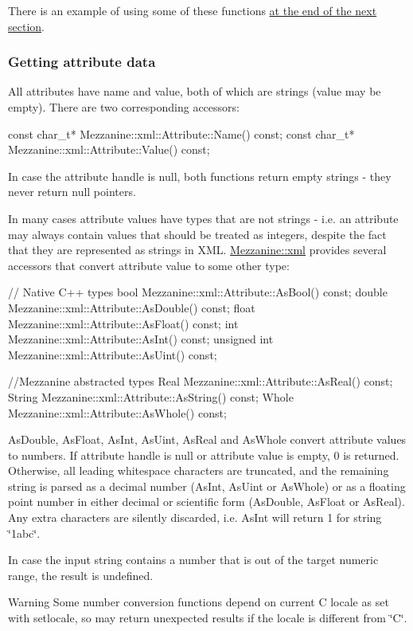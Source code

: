  \par
 There is an example of using some of these functions \hyperlink{XMLManual_XMLAccessingAttributeData}{at the end of the next section}. \hypertarget{XMLManual_XMLAccessingAttributeData}{}\subsubsection{Getting attribute data}\label{XMLManual_XMLAccessingAttributeData}
All attributes have name and value, both of which are strings (value may be empty). There are two corresponding accessors: 
\begin{DoxyCode}
 const char_t* Mezzanine::xml::Attribute::Name() const;
 const char_t* Mezzanine::xml::Attribute::Value() const;
\end{DoxyCode}
 In case the attribute handle is null, both functions return empty strings -\/ they never return null pointers. \par
 \par
 In many cases attribute values have types that are not strings -\/ i.e. an attribute may always contain values that should be treated as integers, despite the fact that they are represented as strings in XML. \hyperlink{namespaceMezzanine_1_1xml}{Mezzanine::xml} provides several accessors that convert attribute value to some other type: 
\begin{DoxyCode}
 // Native C++ types
 bool Mezzanine::xml::Attribute::AsBool() const;
 double Mezzanine::xml::Attribute::AsDouble() const;
 float Mezzanine::xml::Attribute::AsFloat() const;
 int Mezzanine::xml::Attribute::AsInt() const;
 unsigned int Mezzanine::xml::Attribute::AsUint() const;

 //Mezzanine abstracted types
 Real Mezzanine::xml::Attribute::AsReal() const;
 String Mezzanine::xml::Attribute::AsString() const;
 Whole Mezzanine::xml::Attribute::AsWhole() const;
\end{DoxyCode}
 AsDouble, AsFloat, AsInt, AsUint, AsReal and AsWhole convert attribute values to numbers. If attribute handle is null or attribute value is empty, 0 is returned. Otherwise, all leading whitespace characters are truncated, and the remaining string is parsed as a decimal number (AsInt, AsUint or AsWhole) or as a floating point number in either decimal or scientific form (AsDouble, AsFloat or AsReal). Any extra characters are silently discarded, i.e. AsInt will return 1 for string \char`\"{}1abc\char`\"{}. \par
 \par
 In case the input string contains a number that is out of the target numeric range, the result is undefined. \begin{DoxyWarning}{Warning}
Some number conversion functions depend on current C locale as set with setlocale, so may return unexpected results if the locale is different from \char`\"{}C\char`\"{}.
\end{DoxyWarning}
